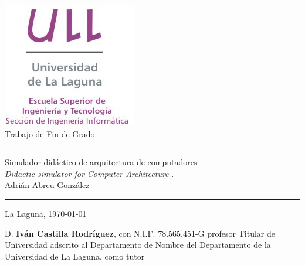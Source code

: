 \documentclass[spanish,a4paper,14pt,oneside]{extreport}
\begin{document}

\pagestyle{empty}
\thispagestyle{empty}


\newcommand{\HRule}{\rule{\linewidth}{1mm}}
\setlength{\parindent}{0mm}
\setlength{\parskip}{0mm}


\begin{center}
\includegraphics[scale=0.8]{images/logo_vertical}\\[10mm]
{\Huge Trabajo de Fin de Grado}
\end{center}

\HRule
\begin{flushright}
        {\Huge Simulador didáctico de arquitectura de computadores} \\[2.5mm]
        {\Large \textit{Didactic simulator for Computer Architecture} .} \\[5mm]
        {\Large Adrián Abreu González} \\[5mm]


\end{flushright}
\HRule
{}
\begin{center}
  \Large La Laguna, \today
\end{center}

\setlength{\parindent}{5mm}

\newpage
\thispagestyle{empty}

D. {\bf Iván Castilla Rodríguez}, con N.I.F. 78.565.451-G
profesor
Titular de Universidad
adscrito al Departamento
de Nombre del Departamento
de la Universidad de La Laguna, como tutor
\end{document}
